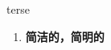 
\begin{frame}
{\huge terse}
\begin{center}
\begin{enumerate}\Large
  \item \textbf{简洁的，简明的}
\end{enumerate}
\end{center}
\end{frame}
